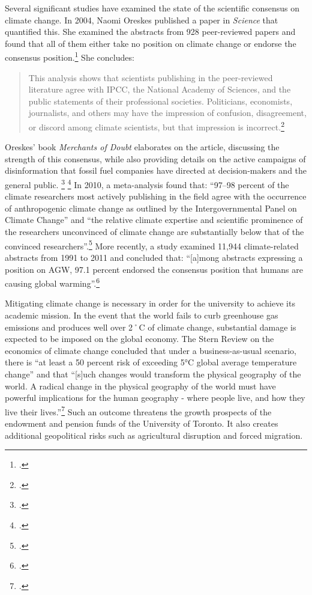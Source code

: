 Several significant studies have examined the state of the scientific consensus on climate change.
In 2004, Naomi Oreskes published a paper in \emph{Science} that quantified this.
She examined the abstracts from 928 peer-reviewed papers and found that all of them either take no position on climate change or endorse the consensus position.\footcite[][p. 1686]{Oreskes2004}
She concludes:
\begin{quote}
This analysis shows that scientists publishing in the peer-reviewed literature agree with IPCC, the National Academy of Sciences, and the public statements of their professional societies. Politicians, economists, journalists, and others may have the impression of confusion, disagreement, or discord among climate scientists, but that impression is incorrect.\footcite[][p. 1686]{Oreskes2004}
\end{quote}
Oreskes' book \emph{Merchants of Doubt} elaborates on the article, discussing the strength of this consensus, while also providing details on the active campaigns of disinformation that fossil fuel companies have directed at decision-makers and the general public. \footcite[][]{MerchantsDoubt} \footcite[See also: ][]{ClimateCoverUp}
In 2010, a meta-analysis found that: ``97–98 percent of the climate researchers most actively publishing in the field agree with the occurrence of anthropogenic climate change as outlined by the Intergovernmental Panel on Climate Change'' and ``the relative climate expertise and scientific prominence of the researchers unconvinced of climate change are substantially below that of the convinced researchers''.\footcite[][p. 1]{ExpertCredibility}
More recently, a study examined 11,944 climate-related abstracts from 1991 to 2011 and concluded that: ``[a]mong abstracts expressing a position on AGW, 97.1 percent endorsed the consensus position that humans are causing global warming''.\footcite[][]{QuantConsensus}


Mitigating climate change is necessary in order for the university to achieve its academic mission. 
In the event that the world fails to curb greenhouse gas emissions and produces well over 2˚C of climate change, substantial damage is expected to be imposed on the global economy.
The Stern Review on the economics of climate change concluded that under a business-as-usual scenario, there is ``at least a 50 percent risk of exceeding 5°C global average temperature change'' and that ``[s]uch changes would transform the physical geography of the world. A radical change in the physical geography of the world must have powerful implications for the human geography - where people live, and how they live their lives.''\footcite[][See long executive summary at: \url{http://www.hm-treasury.gov.uk/d/Executive_Summary.pdf}]{Stern2007}
Such an outcome threatens the growth prospects of the endowment and pension funds of the University of Toronto. 
It also creates additional geopolitical risks such as agricultural disruption and forced migration.



